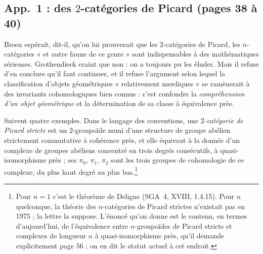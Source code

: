 \documentclass[11pt,a4paper]{article}
\begin{document}
\subsection*{App.~1 : des $2$-catégories de Picard (pages 38 à 40)}

Breen espérait, dit-il, qu'on lui prouverait que les $2$-catégories de
Picard, les $n$-catégories « et autre faune de ce genre » sont
indispensables à des mathématiques sérieuses. Grothendieck craint que non :
on a toujours pu les éluder. Mais il refuse d'en conclure qu'il faut
continuer, et il refuse l'argument selon lequel la classification d'objets
géométriques « relativement merdiques » se ramènerait à des invariants
cohomologiques bien connus : c'est confondre la \emph{compréhension d'un
objet géométrique} et la détermination de sa classe à équivalence près.

Suivent quatre exemples. Dans le langage des conventions, une
\emph{$2$-catégorie de Picard stricte} est un $2$-groupoïde muni d'une
structure de groupe abélien strictement commutative à cohérence près, et
elle équivaut à la donnée d'un complexe de groupes abéliens concentré en
trois degrés consécutifs, à quasi-isomorphisme près ; ses $\pi_0$, $\pi_1$,
$\pi_2$ sont les trois groupes de cohomologie de ce complexe, du plus haut
degré au plus bas.\footnote{Pour $n = 1$ c'est le théorème de Deligne
(SGA~4, XVIII, 1.4.15). Pour $n$ quelconque, la théorie des
$n$-catégories de Picard strictes n'existait pas en 1975 ; la lettre la
suppose. L'énoncé qu'on donne est le contenu, en termes d'aujourd'hui, de
l'équivalence entre $n$-groupoïdes de Picard stricts et complexes de
longueur $n$ à quasi-isomorphisme près, qu'il demande explicitement page
56 ; on en dit le statut actuel à cet endroit.}
\end{document}
